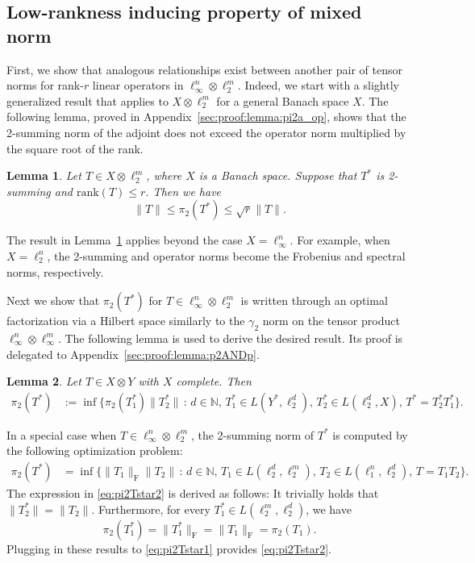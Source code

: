 \documentclass[11pt]{article}
\newtheorem{lemma}{Lemma}[section]
\begin{document}
\subsection{Low-rankness inducing property of mixed norm}

First, we show that analogous relationships exist between another pair of tensor norms for rank-$r$ linear operators in $\ell_\infty^n \otimes \ell_2^m$. 
Indeed, we start with a slightly generalized result that applies to $X \otimes \ell_2^m$ for a general Banach space $X$.
The following lemma, proved in Appendix~\ref{sec:proof:lemma:pi2a_op}, shows that the 2-summing norm of the adjoint does not exceed the operator norm multiplied by the square root of the rank.

\begin{lemma}
\label{lemma:pi2a_op}
Let $T \in X \otimes \ell_2^m$, where $X$ is a Banach space. 
Suppose that $T^*$ is 2-summing and $\mathrm{rank}(T) \leq r$. Then we have
\[
\|T\| \leq \pi_2(T^*) \leq \sqrt{r} \|T\|.
\]
\end{lemma}
\noindent The result in Lemma~\ref{lemma:pi2a_op} applies beyond the case $X = \ell_\infty^n$. 
For example, when $X = \ell_2^n$, the 2-summing and operator norms become the Frobenius and spectral norms, respectively. 

Next we show that $\pi_2(T^*)$ for $T \in \ell_\infty^n \otimes \ell_2^m$ is written through an optimal factorization via a Hilbert space similarly to the $\gamma_2$ norm on the tensor product $\ell_\infty^n \otimes \ell_\infty^m$. 
The following lemma is used to derive the desired result. Its proof is delegated to Appendix~\ref{sec:proof:lemma:p2ANDp}. 
\begin{lemma}
\label{lemma:p2ANDp}
Let $T \in X \otimes Y$ with $X$ complete. Then
\begin{equation}
\label{eq:pi2Tstar1}
\begin{aligned}
\pi_2(T^*)
& := \inf \{ \pi_2(T_1^*) \|T_2^*\| \,:\, d \in \mathbb{N}, \, T_1^* \in L(Y^*,\ell_2^d), \, T_2^* \in L(\ell_2^d,X), \, T^* = T_2^* T_1^* \}.
\end{aligned}
\end{equation}
\end{lemma}
\noindent In a special case when $T \in \ell_\infty^n \otimes \ell_2^m$, the 2-summing norm of $T^*$ is computed by the following optimization problem:
\begin{equation}
\label{eq:pi2Tstar2}
\begin{aligned}
\pi_2(T^*)
& = \inf \{ \|T_1\|_\mathrm{F} \|T_2\| \,:\, d \in \mathbb{N}, \, T_1 \in L(\ell_2^d,\ell_2^m), \, T_2 \in L(\ell_1^n,\ell_2^d), \, T = T_1 T_2 \}.
\end{aligned}
\end{equation}
The expression in \eqref{eq:pi2Tstar2} is derived as follows: 
It trivially holds that $\|T_2^*\| = \|T_2\|$. 
Furthermore, for every $T_1^* \in L(\ell_2^m,\ell_2^d)$, we have
\[
\pi_2(T_1^*) = \|T_1^*\|_\mathrm{F} = \|T_1\|_\mathrm{F} = \pi_2(T_1).
\]
Plugging in these results to \eqref{eq:pi2Tstar1} provides \eqref{eq:pi2Tstar2}. 
\end{document}
